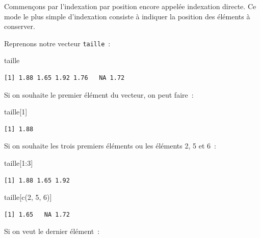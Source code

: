 \documentclass[
  letterpaper,
  DIV=11,
  numbers=noendperiod,
  oneside]{scrreprt}
\newenvironment{Shaded}{\begin{snugshade}}{\end{snugshade}}
\newcommand{\DecValTok}[1]{\textcolor[rgb]{0.68,0.00,0.00}{#1}}
\newcommand{\FunctionTok}[1]{\textcolor[rgb]{0.28,0.35,0.67}{#1}}
\newcommand{\NormalTok}[1]{\textcolor[rgb]{0.00,0.23,0.31}{#1}}
\newcommand{\SpecialCharTok}[1]{\textcolor[rgb]{0.37,0.37,0.37}{#1}}
\begin{document}
Commençons par l'indexation par position encore appelée indexation
directe. Ce mode le plus simple d'indexation consiste à indiquer la
position des éléments à conserver.

Reprenons notre vecteur \texttt{taille}~:

\begin{Shaded}
\begin{Highlighting}[]
\NormalTok{taille}
\end{Highlighting}
\end{Shaded}

\begin{verbatim}
[1] 1.88 1.65 1.92 1.76   NA 1.72
\end{verbatim}

Si on souhaite le premier élément du vecteur, on peut faire~:

\begin{Shaded}
\begin{Highlighting}[]
\NormalTok{taille[}\DecValTok{1}\NormalTok{]}
\end{Highlighting}
\end{Shaded}

\begin{verbatim}
[1] 1.88
\end{verbatim}

Si on souhaite les trois premiers éléments ou les éléments 2, 5 et 6~:

\begin{Shaded}
\begin{Highlighting}[]
\NormalTok{taille[}\DecValTok{1}\SpecialCharTok{:}\DecValTok{3}\NormalTok{]}
\end{Highlighting}
\end{Shaded}

\begin{verbatim}
[1] 1.88 1.65 1.92
\end{verbatim}

\begin{Shaded}
\begin{Highlighting}[]
\NormalTok{taille[}\FunctionTok{c}\NormalTok{(}\DecValTok{2}\NormalTok{, }\DecValTok{5}\NormalTok{, }\DecValTok{6}\NormalTok{)]}
\end{Highlighting}
\end{Shaded}

\begin{verbatim}
[1] 1.65   NA 1.72
\end{verbatim}

Si on veut le dernier élément~:
\end{document}
